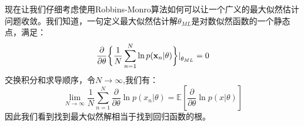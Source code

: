 \documentclass[10pt,a4paper,UTF8]{article}
\begin{document}
现在让我们仔细考虑使用Robbins-Monro算法如何可以让一个广义的最大似然估计问题收敛。我们知道，一句定义最大似然估计解\(\theta_{ML}\)是对数似然函数的一个静态点，满足：
\begin{equation}
\label{eq:12}
\frac{\partial}{\partial\theta } \bigg\{ \frac{1}{N}\sum_{n=1}^{N}\ln p(\mathbf{x}_{n}|\theta) \bigg\}{\huge{\lvert}}_{\theta_{ML}} = 0
\end{equation}
交换积分和求导顺序，令\(N\to \infty\),我们有：
\begin{equation}
\label{eq:13}
\lim_{N\to \infty}\frac{1}{N}\sum_{n=1}^{N}\frac{\partial}{\partial \theta}\ln p(x_{n}|\theta) = \mathbb{E}[\frac{\partial}{\partial \theta} \ln p(x|\theta)]
\end{equation}
因此我们看到找到最大似然解相当于找到回归函数的根。
\end{document}
